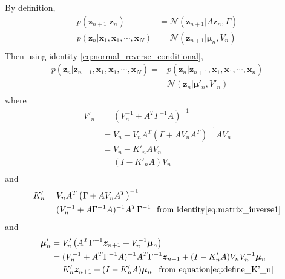 \documentclass[a4]{article}
\begin{document}
By definition,
\begin{equation}
\begin{aligned}
p(\bm{z}_{n+1}|\bm{z}_n) &= \mathcal{N}(\bm{z}_{n+1}|A\bm{z}_n, \Gamma)\\
p(\bm{z}_{n}  | \bm{x}_1, \bm{x}_1, \cdots, \bm{x}_N)
&= \mathcal{N}(\bm{z}_{n+1}|\bm{\mu}_n, V_n)\\
\end{aligned}
\end{equation}
Then using identity \ref{eq:normal_reverse_conditional},
\begin{equation}
\begin{aligned}
p(\bm{z}_{n}|\bm{z}_{n+1}, \bm{x}_1, \bm{x}_1, \cdots, \bm{x}_N) =&
p(\bm{z}_{n}|\bm{z}_{n+1}, \bm{x}_1, \bm{x}_1, \cdots, \bm{x}_n)\\
=& \mathcal{N} ( \bm{z}_{n} | \bm{\mu}'_n, V'_n ) \\
\end{aligned}
\end{equation}
where
\begin{equation}
\begin{aligned}
V'_n &= \left(V_n^{-1} + A^T\Gamma^{-1}A\right)^{-1}\\
     &= V_n - V_n A^T\left(\Gamma + AV_nA^T\right)^{-1}AV_n\\
     &= V_n - K'_n AV_n\\
     &= (I - K'_n A)V_n\\
\end{aligned}
\end{equation}
and
\begin{equation}
\begin{aligned}
K'_n &=  V_n A^T\left(\Gamma + AV_nA^T\right)^{-1}\\
     &=  (V_n^{-1} + A\Gamma^{-1}A)^{-1}A^T\Gamma^{-1}\:\:\:\text{from identity}
\label{eq:define_K'_n}\ref{eq:matrix_inverse1}\\
\end{aligned}
\end{equation}
and
\begin{equation}
\begin{aligned}
\bm{\mu}'_n &= V'_n \left(A^T\Gamma^{-1}\bm{z}_{n+1} + V^{-1}_n\bm{\mu}_n\right)\\
&= (V^{-1}_n + A^T\Gamma^{-1}A)^{-1}A^T\Gamma^{-1}\bm{z}_{n+1} + (I - K'_n A)V_nV_n^{-1}\bm{\mu}_n\\
&= K'_n\bm{z}_{n+1} + (I - K'_n A)\bm{\mu}_n\:\:\text{ from equation\ref{eq:define_K'_n}}\\
\end{aligned}
\end{equation}
\end{document}
